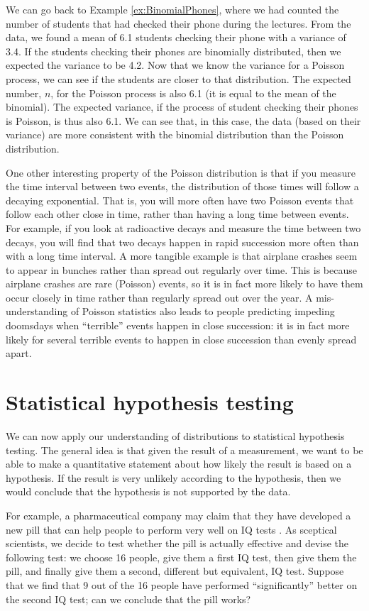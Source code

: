 We can go back to Example \ref{ex:BinomialPhones}, where we had counted the number of students that had checked their phone during the lectures. From the data, we found a mean of 6.1 students checking their phone with a variance of 3.4. If the students checking their phones are binomially distributed, then we expected the variance to be 4.2. Now that we know the variance for a Poisson process, we can see if the students are closer to that distribution. The expected number, $n$, for the Poisson process is also 6.1 (it is equal to the mean of the binomial). The expected variance, if the process of student checking their phones is Poisson, is thus also 6.1. We can see that, in this case, the data (based on their variance) are more consistent with the binomial distribution than the Poisson distribution.

One other interesting property of the Poisson distribution is that if you measure the time interval between two events, the distribution of those times will follow a decaying exponential. That is, you will more often have two Poisson events that follow each other close in time, rather than having a long time between events. For example, if you look at radioactive decays and measure the time between two decays, you will find that two decays happen in rapid succession more often than with a long time interval. A more tangible example is that airplane crashes seem to appear in bunches rather than spread out regularly over time. This is because airplane crashes are rare (Poisson) events, so it is in fact more likely to have them occur closely in time rather than regularly spread out over the year. A mis-understanding of Poisson statistics also leads to people predicting impeding doomsdays when ``terrible'' events happen in close succession: it is in fact more likely for several terrible events to happen in close succession than evenly spread apart. 

\section{Statistical hypothesis testing}
We can now apply our understanding of distributions to statistical hypothesis testing. The general idea is that given the result of a measurement, we want to be able to make a quantitative statement about how likely the result is based on a hypothesis. If the result is very unlikely according to the hypothesis, then we would conclude that the hypothesis is not supported by the data. 

For example, a pharmaceutical company may claim that they have developed a new pill that can help people to perform very well on IQ tests . As sceptical scientists, we decide to test whether the pill is actually effective and devise the following test: we choose 16 people, give them a first IQ test, then give them the pill, and finally give them a second, different but equivalent, IQ test. Suppose that we find that 9 out of the 16 people have performed ``significantly'' better on the second IQ test; can we conclude that the pill works?


